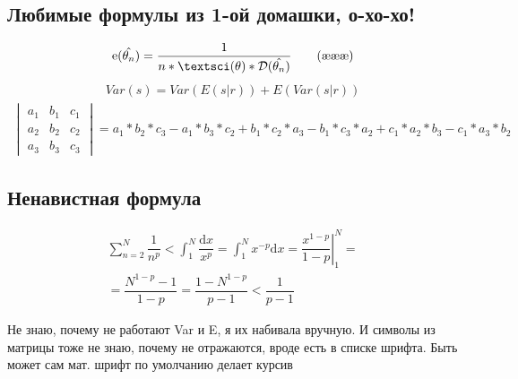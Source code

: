\documentclass[a4paper,oneside,titlepage,10pt]{extbook}
\begin{document}
\subsection*{Любимые формулы из 1-ой домашки, о-хо-хо!}
 \begin{align}
\mathrm{e}(\hat{\theta_n})=\dfrac{1}{n*\textsci(\theta)*\mathcal{D}(\hat{\theta_n})} \tag{\ae\ae\ae}\label{aster3}
 \end{align}
 \begin{align}
Var(s)=Var(E(s|r))+E(Var(s|r))  \tag{\ae\ae\ae\ae}\label{aster4}
 \end{align}
 \begin{align}
\begin{vmatrix} 
a_1 & b_1 & c_1 \\ 
a_2 & b_2 & c_2\\ 
a_3 & b_3 & c_3 \end{vmatrix}=a_1*b_2*c_3−a_1*b_3*c_2+b_1*c_2*a_3 − b_1*c_3*a_2+ c_1*a_2* b_3−c_1* a_3* b_2  \tag{\ae\ae\ae\ae\ae}\label{aster5}
 \end{align} 
 
\subsection*{Ненавистная формула}
 \begin{multline}
 \sum_{n=2}^{N} \dfrac{1}{n^p} < \int_1^N \dfrac{\mathrm{d}x}{x^p}=\int_1^N x^{-p}\mathrm{d}x=\left.\dfrac{x^{1-p}}{1-p}\right|_1^N = \\
 = \dfrac{N^{1-p}-1}{1-p}=\dfrac{1-N^{1-p}}{p-1}<\dfrac{1}{p-1} \tag{\ae\ae\ae\ae\ae\ae}
 \end{multline}
 
 Не знаю, почему не работают Var и E, я их набивала вручную. 
 И символы из матрицы тоже не знаю, почему не отражаются, вроде есть в списке шрифта. 
 Быть может сам мат. шрифт по умолчанию делает курсив
  
\end{document}
